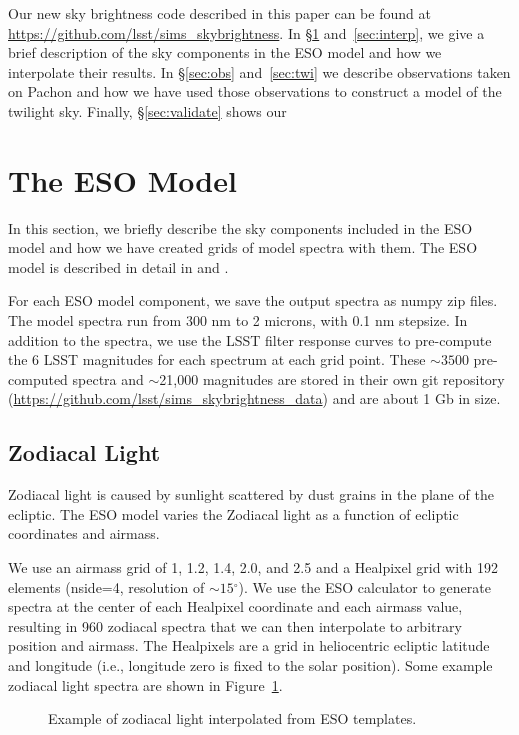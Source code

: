 \documentclass[]{spie}
\newcommand\degree{{^\circ}}
\begin{document}
Our new sky brightness code described in this paper can be found at \url{https://github.com/lsst/sims\_skybrightness}. In \S\ref{sec:eso} and~\ref{sec:interp}, we give a brief description of the sky components in the ESO model and how we interpolate their results. In \S\ref{sec:obs} and~\ref{sec:twi} we describe observations taken on Pachon and how we have used those observations to construct a model of the twilight sky.  Finally, \S\ref{sec:validate} shows our 

\section{The ESO Model}\label{sec:eso}
In this section, we briefly describe the sky components included in the ESO model and how we have created grids of model spectra with them. The ESO model is described in detail in \citet{Noll12} and \citet{Jones13}.

For each ESO model component, we save the output spectra as numpy zip files.  The model spectra run from 300 nm to 2 microns, with 0.1 nm stepsize.  In addition to the spectra, we use the LSST filter response curves to pre-compute the 6 LSST magnitudes for each spectrum at each grid point. These $\sim3500$ pre-computed spectra and $\sim$21,000 magnitudes are stored in their own git repository (\url{https://github.com/lsst/sims\_skybrightness\_data}) and are about 1 Gb in size.

\subsection{Zodiacal Light}
Zodiacal light is caused by sunlight scattered by dust grains in the plane of the ecliptic.  The ESO model varies the Zodiacal light as a function of ecliptic coordinates and airmass.  

We use an airmass grid of 1, 1.2, 1.4, 2.0, and 2.5 and a Healpixel \citep{Gorski99} grid with 192 elements (nside=4, resolution of $\sim15\degree$).  We use the ESO calculator to generate spectra at the center of each Healpixel coordinate and each airmass value, resulting in 960 zodiacal spectra that we can then interpolate to arbitrary position and airmass.  The Healpixels are a grid in heliocentric ecliptic latitude and longitude (i.e., longitude zero is fixed to the solar position).  Some example zodiacal light spectra are shown in Figure~\ref{fig:zodiacal}. 


\begin{figure}
  \caption{Example of zodiacal light interpolated from ESO templates. \label{fig:zodiacal}}
\end{figure}
\end{document}

